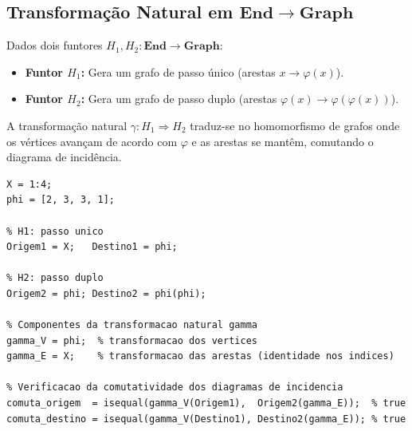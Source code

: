 \subsection{Transformação Natural em $\mathbf{End} \to \mathbf{Graph}$}

Dados dois funtores $H_1, H_2: \mathbf{End} \to \mathbf{Graph}$:
\begin{itemize}
    \item \textbf{Funtor $H_1$:} Gera um grafo de passo único (arestas $x \to \varphi(x)$).
    \item \textbf{Funtor $H_2$:} Gera um grafo de passo duplo (arestas $\varphi(x) \to \varphi(\varphi(x))$).
\end{itemize}
A transformação natural $\gamma: H_1 \Rightarrow H_2$ traduz-se no homomorfismo de grafos onde os vértices avançam de acordo com $\varphi$ e as arestas se mantêm, comutando o diagrama de incidência.

\begin{lstlisting}[style=matlab, caption={Transformação natural $\gamma: H_1 \Rightarrow H_2$ em $\mathbf{End} \to \mathbf{Graph}$}]
X = 1:4;
phi = [2, 3, 3, 1];

% H1: passo unico
Origem1 = X;   Destino1 = phi;

% H2: passo duplo
Origem2 = phi; Destino2 = phi(phi);

% Componentes da transformacao natural gamma
gamma_V = phi;  % transformacao dos vertices
gamma_E = X;    % transformacao das arestas (identidade nos indices)

% Verificacao da comutatividade dos diagramas de incidencia
comuta_origem  = isequal(gamma_V(Origem1),  Origem2(gamma_E));  % true
comuta_destino = isequal(gamma_V(Destino1), Destino2(gamma_E)); % true
\end{lstlisting}
